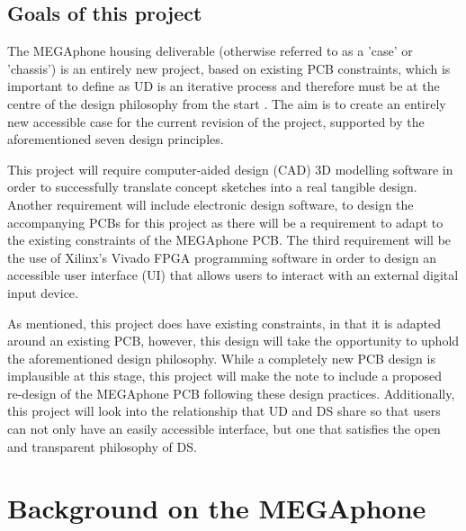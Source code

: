 \subsection{Goals of this project} \label{Goals}
The MEGAphone housing deliverable (otherwise referred to as a 'case' or 'chassis') is an entirely new project, based on existing PCB constraints, which is important to define as UD is an iterative process and therefore must be at the centre of the design philosophy from the start \cite{incldesign}.
The aim is to create an entirely new accessible case for the current revision of the project, supported by the aforementioned seven design principles.

This project will require computer-aided design (CAD) 3D modelling software in order to successfully translate concept sketches into a real tangible design.
Another requirement will include electronic design software, to design the accompanying PCBs for this project as there will be a requirement to adapt to the existing constraints of the MEGAphone PCB.
The third requirement will be the use of Xilinx's Vivado FPGA programming software in order to design an accessible user interface (UI) that allows users to interact with an external digital input device.

As mentioned, this project does have existing constraints, in that it is adapted around an existing PCB, however, this design will take the opportunity to uphold the aforementioned design philosophy.
While a completely new PCB design is implausible at this stage, this project will make the note to include a proposed re-design of the MEGAphone PCB following these design practices.
Additionally, this project will look into the relationship that UD and DS share so that users can not only have an easily accessible interface, but one that satisfies the open and transparent philosophy of DS.

\section{Background on the MEGAphone}

